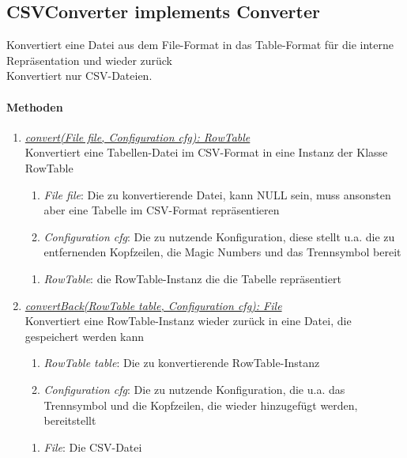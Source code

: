 \subsection*{CSVConverter implements Converter}\label{csvConv}
Konvertiert eine Datei aus dem File-Format in das Table-Format für die interne Repräsentation und wieder zurück \\
Konvertiert nur CSV-Dateien. \\

\paragraph{Methoden}

\begin{enumerate}[+]
	\item \underline{\textit{convert(File file, Configuration cfg): RowTable}} \\
	Konvertiert eine Tabellen-Datei im CSV-Format in eine Instanz der Klasse RowTable
	
	\begin{enumerate}[$\bullet$]
		\item \textit{File file}: Die zu konvertierende Datei, kann NULL sein, muss ansonsten aber eine Tabelle im CSV-Format repräsentieren
		\item \textit{Configuration cfg}: Die zu nutzende Konfiguration, diese stellt u.a. die zu entfernenden Kopfzeilen, die Magic Numbers und das Trennsymbol bereit
	\end{enumerate}
	\vspace{-0.2cm}
	\begin{enumerate}[$\circ$]
		\item \textit{RowTable}: die RowTable-Instanz die die Tabelle repräsentiert
	\end{enumerate}
	
	\item \underline{\textit{convertBack(RowTable table, Configuration cfg): File}} \\
	Konvertiert eine RowTable-Instanz wieder zurück in eine Datei, die gespeichert werden kann
	\begin{enumerate}[$\bullet$]
		\item \textit{RowTable table}: Die zu konvertierende RowTable-Instanz
		\item \textit{Configuration cfg}: Die zu nutzende Konfiguration, die u.a. das Trennsymbol und die Kopfzeilen, die wieder hinzugefügt werden, bereitstellt
	\end{enumerate}
	\vspace{-0.2cm}
	\begin{enumerate}[$\circ$]
		\item \textit{File}: Die CSV-Datei
	\end{enumerate}


\end{enumerate}

